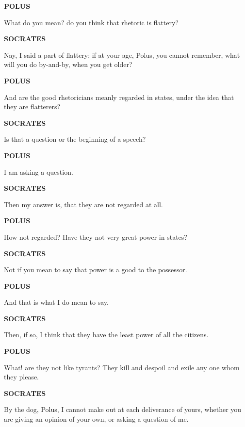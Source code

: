 \documentclass[11pt,letter]{article}
\begin{document}
\par \textbf{POLUS}
\par   What do you mean? do you think that rhetoric is flattery?

\par \textbf{SOCRATES}
\par   Nay, I said a part of flattery; if at your age, Polus, you cannot remember, what will you do by-and-by, when you get older?

\par \textbf{POLUS}
\par   And are the good rhetoricians meanly regarded in states, under the idea that they are flatterers?

\par \textbf{SOCRATES}
\par   Is that a question or the beginning of a speech?

\par \textbf{POLUS}
\par   I am asking a question.

\par \textbf{SOCRATES}
\par   Then my answer is, that they are not regarded at all.

\par \textbf{POLUS}
\par   How not regarded? Have they not very great power in states?

\par \textbf{SOCRATES}
\par   Not if you mean to say that power is a good to the possessor.

\par \textbf{POLUS}
\par   And that is what I do mean to say.

\par \textbf{SOCRATES}
\par   Then, if so, I think that they have the least power of all the citizens.

\par \textbf{POLUS}
\par   What! are they not like tyrants? They kill and despoil and exile any one whom they please.

\par \textbf{SOCRATES}
\par   By the dog, Polus, I cannot make out at each deliverance of yours, whether you are giving an opinion of your own, or asking a question of me.
\end{document}

